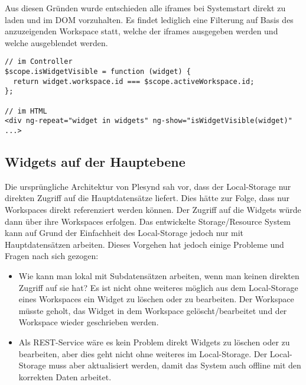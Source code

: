 Aus diesen Gründen wurde entschieden alle iframes bei Systemstart direkt zu laden und im DOM vorzuhalten. Es findet lediglich eine Filterung auf Basis des anzuzeigenden Workspace statt, welche der iframes ausgegeben werden und welche ausgeblendet werden.
\begin{lstlisting}
// im Controller
$scope.isWidgetVisible = function (widget) {
  return widget.workspace.id === $scope.activeWorkspace.id;
};

// im HTML
<div ng-repeat="widget in widgets" ng-show="isWidgetVisible(widget)" ...>
\end{lstlisting}

\subsection{Widgets auf der Hauptebene}
Die ursprüngliche Architektur von Plesynd sah vor, dass der Local-Storage nur direkten Zugriff auf die Hauptdatensätze liefert. Dies hätte zur Folge, dass nur Workspaces direkt referenziert werden können. Der Zugriff auf die Widgets würde dann über ihre Workspaces erfolgen. Das entwickelte Storage/Resource System kann auf Grund der Einfachheit des Local-Storage jedoch nur mit Hauptdatensätzen arbeiten. Dieses Vorgehen hat jedoch einige Probleme und Fragen nach sich gezogen: 
\begin{itemize}
 \item Wie kann man lokal mit Subdatensätzen arbeiten, wenn man keinen direkten Zugriff auf sie hat? Es ist nicht ohne weiteres möglich aus dem Local-Storage eines Workspaces ein Widget zu löschen oder zu bearbeiten. Der Workspace müsste geholt, das Widget in dem Workspace gelöscht/bearbeitet und der Workspace wieder geschrieben werden. 
 \item Als REST-Service wäre es kein Problem direkt Widgets zu löschen oder zu bearbeiten, aber dies geht nicht ohne weiteres im Local-Storage. Der Local-Storage muss aber aktualisiert werden, damit das System auch offline mit den korrekten Daten arbeitet.
\end{itemize} 

